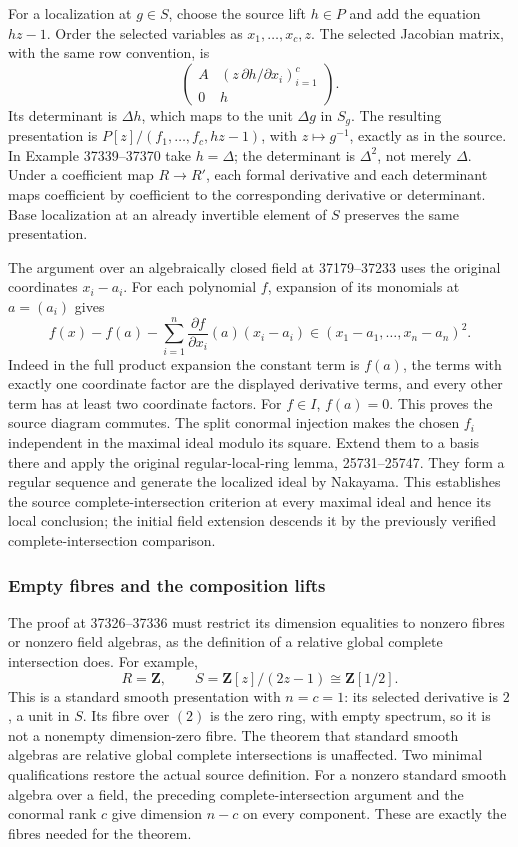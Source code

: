 For a localization at \(g\in S\), choose the source lift \(h\in P\) and add the equation \(hz-1\). Order the selected variables as \(x_1,\ldots,x_c,z\). The selected Jacobian matrix, with the same row convention, is \[
\begin{pmatrix}
A & (z\,\partial h/\partial x_i)_{i=1}^c\\
0 & h
\end{pmatrix}.
\] Its determinant is \(\Delta h\), which maps to the unit \(\Delta g\) in \(S_g\). The resulting presentation is \(P[z]/(f_1,\ldots,f_c,hz-1)\), with \(z\mapsto g^{-1}\), exactly as in the source. In Example 37339--37370 take \(h=\Delta\); the determinant is \(\Delta^2\), not merely \(\Delta\). Under a coefficient map \(R\to R'\), each formal derivative and each determinant maps coefficient by coefficient to the corresponding derivative or determinant. Base localization at an already invertible element of \(S\) preserves the same presentation.

The argument over an algebraically closed field at 37179--37233 uses the original coordinates \(x_i-a_i\). For each polynomial \(f\), expansion of its monomials at \(a=(a_i)\) gives \[
f(x)-f(a)-\sum_{i=1}^n\frac{\partial f}{\partial x_i}(a)(x_i-a_i)
\in(x_1-a_1,\ldots,x_n-a_n)^2.
\] Indeed in the full product expansion the constant term is \(f(a)\), the terms with exactly one coordinate factor are the displayed derivative terms, and every other term has at least two coordinate factors. For \(f\in I\), \(f(a)=0\). This proves the source diagram commutes. The split conormal injection makes the chosen \(f_i\) independent in the maximal ideal modulo its square. Extend them to a basis there and apply the original regular-local-ring lemma, 25731--25747. They form a regular sequence and generate the localized ideal by Nakayama. This establishes the source complete-intersection criterion at every maximal ideal and hence its local conclusion; the initial field extension descends it by the previously verified complete-intersection comparison.

\subsubsection{Empty fibres and the composition lifts}\label{empty-fibres-and-the-composition-lifts}

The proof at 37326--37336 must restrict its dimension equalities to nonzero fibres or nonzero field algebras, as the definition of a relative global complete intersection does. For example, \[
R=\mathbf Z,\qquad S=\mathbf Z[z]/(2z-1)\cong\mathbf Z[1/2].
\] This is a standard smooth presentation with \(n=c=1\): its selected derivative is \(2\), a unit in \(S\). Its fibre over \((2)\) is the zero ring, with empty spectrum, so it is not a nonempty dimension-zero fibre. The theorem that standard smooth algebras are relative global complete intersections is unaffected. Two minimal qualifications restore the actual source definition. For a nonzero standard smooth algebra over a field, the preceding complete-intersection argument and the conormal rank \(c\) give dimension \(n-c\) on every component. These are exactly the fibres needed for the theorem.

